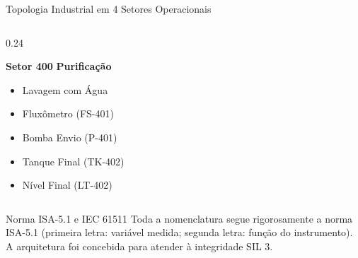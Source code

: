 \documentclass[aspectratio=169, 10pt]{beamer}
\begin{document}
\begin{frame}{Topologia Industrial em 4 Setores Operacionais}
\begin{columns}[t]
    \begin{column}{0.24\textwidth}
      \begin{block}{\textbf{Setor 400}}
        \scriptsize
        \textbf{Purificação}
        \begin{itemize}
          \item Lavagem com Água
          \item Fluxômetro (FS-401)
          \item Bomba Envio (P-401)
          \item Tanque Final (TK-402)
          \item Nível Final (LT-402)
        \end{itemize}
      \end{block}
    \end{column}
  \end{columns}
  \vspace{0.4cm}
  \begin{exampleblock}{Norma ISA-5.1 e IEC 61511}
    Toda a nomenclatura segue rigorosamente a norma ISA-5.1 (primeira letra: variável medida; segunda letra: função do instrumento). A arquitetura foi concebida para atender à integridade SIL 3.
  \end{exampleblock}
\end{frame}
\end{document}
